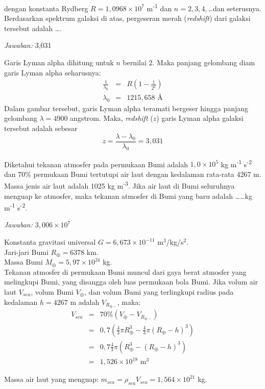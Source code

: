 \documentclass[11pt,fleqn]{exam}
\begin{document}
\begin{questions}
dengan konstanta Rydberg $R=1,0968\times 10^7$ m\textsuperscript{-1} dan $n=2,3,4,$\ldots dan seterusnya. Berdasarkan spektrum galaksi di atas, pergeseran merah (\textit{redshift}) dari galaksi tersebut adalah \ldots.

\textit{Jawaban: } 3,031

Garis Lyman alpha dihitung untuk $n$ bernilai 2. Maka panjang gelombang diam garis Lyman alpha seharusnya: 
\begin{eqnarray*}
\frac{1}{\lambda_0} &=& R(1-\frac{1}{2^2})\\
\lambda_0 &=& 1215,658 \text{  \AA}
\end{eqnarray*}
Dalam gambar tersebut, garis Lyman alpha teramati bergeser hingga panjang gelombang $\lambda=4900$ angstrom. Maka, \textit{redshift} ($z$) garis Lyman alpha galaksi tersebut adalah sebesar 
$$z=\frac{\lambda-\lambda_0}{\lambda_0}=3,031$$

\question Diketahui tekanan atmosfer pada permukaan Bumi adalah $1,0\times 10^5$ kg m\textsuperscript{-1} s\textsuperscript{-2} dan 70\% permukaan Bumi tertutupi air laut dengan kedalaman rata-rata 4267 m. Massa jenis air laut adalah 1025 kg m\textsuperscript{-3}. Jika air laut di Bumi seluruhnya menguap ke atmosfer, maka tekanan atmosfer di Bumi yang baru adalah \ldots\ldots kg m\textsuperscript{-1} s\textsuperscript{-2}.

\textit{Jawaban: } $3,006\times 10^7$

Konstanta gravitasi universal $G=6,673\times 10^{-11}$ m$^3$/kg/s$^2$.\\
Jari-jari Bumi $R_{\oplus}=6378$ km.\\
Massa Bumi $M_{\oplus}=5,97\times 10^{24}$ kg.\\
Tekanan atmosfer di permukaan Bumi muncul dari gaya berat atmosfer yang melingkupi Bumi, yang disangga oleh luas permukaan bola Bumi. Jika volum air laut $V_{sea}$, volum Bumi $V_{\oplus}$, dan volum Bumi yang terlingkupi radius pada kedalaman $h=4267$ m adalah $V_{R_{\oplus-}}$, maka:
\begin{eqnarray*}
V_{sea}&=&70\%(V_{\oplus}-V_{R_{\oplus-}})\\
&=&0,7(\frac{4}{3}\pi R_{\oplus}^3-\frac{4}{3}\pi (R_{\oplus}-h)^3)\\
&=&0,7\frac{4}{3}\pi(R_{\oplus}^3-(R_{\oplus}-h)^3)\\
&=&1,526\times 10^{18} \text{ m$^3$}
\end{eqnarray*}

Massa air laut yang menguap: $m_{sea}=\rho_{sea}V_{sea}=1,564\times 10^{21}$ kg.


\end{questions}
\end{document}
